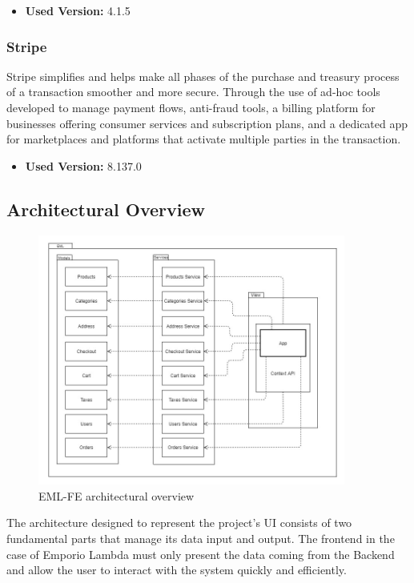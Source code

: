 \begin{itemize}
    \item \textbf{Used Version:} 4.1.5
\end{itemize}

\subsubsection{Stripe}
Stripe simplifies and helps make all phases of the purchase and treasury process of a transaction smoother and more secure. Through the use of ad-hoc tools developed to manage payment flows, anti-fraud tools, a billing platform for businesses offering consumer services and subscription plans, and a dedicated app for marketplaces and platforms that activate multiple parties in the transaction.

\begin{itemize}
    \item \textbf{Used Version:} 8.137.0
\end{itemize}

\subsection{Architectural Overview} \label{_feArchitecture}

\begin{figure}[H]
    \centering
    \includegraphics[width=0.9\textwidth]{res/images/frontend-diagrams/EML-FE.jpg}
    \caption{EML-FE architectural overview}
\end{figure}

The architecture designed to represent the project's UI consists of two fundamental parts that manage its data input and output. The frontend in the case of Emporio Lambda must only present the data coming from the Backend and allow the user to interact with the system quickly and efficiently.

